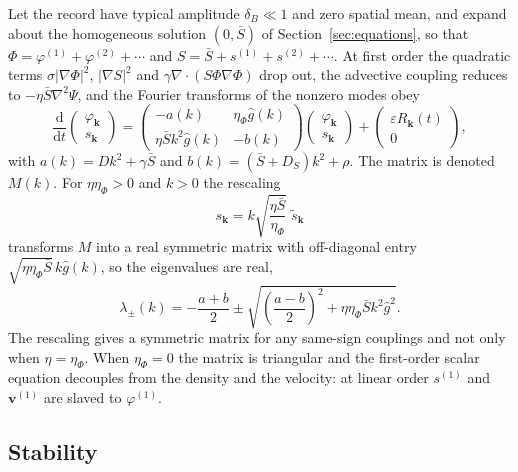 \documentclass[11pt]{article}
\theoremstyle{definition}
\theoremstyle{remark}
\newcommand{\dd}{\mathrm{d}}
\newcommand{\vv}{\mathbf{v}}
\newcommand{\Sb}{\bar{S}}
\begin{document}
Let the record have typical amplitude $\delta_B\ll1$ and zero spatial mean, and expand about the homogeneous solution $(0,\Sb)$ of Section~\ref{sec:equations}, so that $\Phi=\varphi^{(1)}+\varphi^{(2)}+\cdots$ and $S=\Sb+s^{(1)}+s^{(2)}+\cdots$. At first order the quadratic terms $\sigma|\nabla\Phi|^2$, $|\nabla S|^2$ and $\gamma\nabla\!\cdot\!(S\Phi\nabla\Phi)$ drop out, the advective coupling reduces to $-\eta\Sb\nabla^2\Psi$, and the Fourier transforms of the nonzero modes obey
\begin{equation}
\frac{\dd}{\dd t}\begin{pmatrix}\varphi_{\mathbf k}\\s_{\mathbf k}\end{pmatrix}=\begin{pmatrix}-a(k)&\eta_\Phi\hat g(k)\\\eta\Sb k^2\hat g(k)&-b(k)\end{pmatrix}\begin{pmatrix}\varphi_{\mathbf k}\\s_{\mathbf k}\end{pmatrix}+\begin{pmatrix}\varepsilon R_{\mathbf k}(t)\\0\end{pmatrix},
\label{eq:linear}
\end{equation}
with $a(k)=Dk^2+\gamma\Sb$ and $b(k)=(\Sb+D_S)k^2+\rho$. The matrix is denoted $M(k)$. For $\eta\eta_\Phi>0$ and $k>0$ the rescaling
\begin{equation}
s_{\mathbf k}=k\sqrt{\frac{\eta\Sb}{\eta_\Phi}}\;\tilde s_{\mathbf k}
\end{equation}
transforms $M$ into a real symmetric matrix with off-diagonal entry $\sqrt{\eta\eta_\Phi\Sb}\,k\hat g(k)$, so the eigenvalues are real,
\begin{equation}
\lambda_\pm(k)=-\frac{a+b}{2}\pm\sqrt{\left(\frac{a-b}{2}\right)^2+\eta\eta_\Phi\Sb k^2\hat g^2}.
\end{equation}
The rescaling gives a symmetric matrix for any same-sign couplings and not only when $\eta=\eta_\Phi$. When $\eta_\Phi=0$ the matrix is triangular and the first-order scalar equation decouples from the density and the velocity: at linear order $s^{(1)}$ and $\vv^{(1)}$ are slaved to $\varphi^{(1)}$.

\subsection{Stability}
\end{document}
